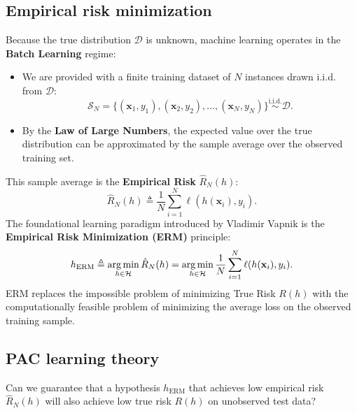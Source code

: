 \subsection{Empirical risk minimization}
\label{sec:erm_principle}

Because the true distribution $\mathcal{D}$ is unknown, machine learning operates in the \textbf{Batch Learning} regime:
\begin{itemize}[noitemsep]
  \item We are provided with a finite training dataset of $N$ instances drawn i.i.d. from $\mathcal{D}$:
  \begin{equation}
  \mathcal{S}_N = \{(\mathbf{x}_1, y_1), (\mathbf{x}_2, y_2), \dots, (\mathbf{x}_N, y_N)\} \stackrel{\text{i.i.d.}}{\sim} \mathcal{D}.
  \end{equation}
  \item By the \textbf{Law of Large Numbers}, the expected value over the true distribution can be approximated by the sample average over the observed training set.
\end{itemize}

This sample average is the \textbf{Empirical Risk} $\hat{R}_N(h)$:
\begin{equation}
\hat{R}_N(h) \triangleq \frac{1}{N} \sum_{i=1}^N \ell(h(\mathbf{x}_i), y_i).
\label{eq:empirical_risk_definition}
\end{equation}
The foundational learning paradigm introduced by Vladimir Vapnik is the \textbf{Empirical Risk Minimization (ERM)} principle:
\begin{equation}
h_{\text{ERM}} \triangleq \operatorname*{arg\,min}_{h \in \mathcal{H}} \hat{R}_N(h) = \operatorname*{arg\,min}_{h \in \mathcal{H}} \frac{1}{N} \sum_{i=1}^N \ell(h(\mathbf{x}_i), y_i).
\label{eq:erm_principle_equation}
\end{equation}
ERM replaces the impossible problem of minimizing True Risk $R(h)$ with the computationally feasible problem of minimizing the average loss on the observed training sample.

\subsection{PAC learning theory}
\label{sec:pac_learning_theory}

Can we guarantee that a hypothesis $h_{\text{ERM}}$ that achieves low empirical risk $\hat{R}_N(h)$ will also achieve low true risk $R(h)$ on unobserved test data?

